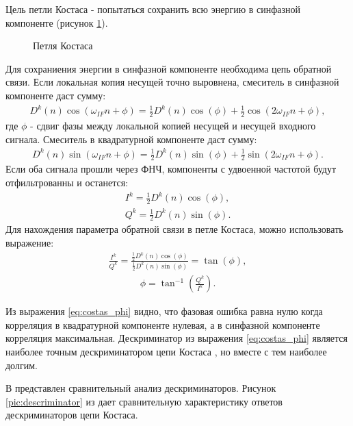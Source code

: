 Цель петли Костаса - попытаться сохранить всю энергию в синфазной компоненте (рисунок \ref{pic:costas}).

\begin{figure}[H]
\begin{center}
\end{center}
\caption{Петля Костаса}
\label{pic:costas}
\end{figure}

Для сохраниения энергии в синфазной компоненте необходима цепь обратной связи. Если локальная копия несущей точно выровнена, смеситель в 
синфазной компоненте даст сумму:
\begin{eqnarray}
D^k(n)\cos(\omega_{IF}n + \phi) = \frac{1}{2}D^k(n)\cos(\phi) + \frac{1}{2}\cos(2\omega_{IF}n + \phi),
\label{eq:costas_i}
\end{eqnarray}
где ${\phi}$ - сдвиг фазы между локальной копией несущей и несущей входного сигнала. Смеситель в квадратурной
компоненте даст сумму:
\begin{eqnarray}
D^k(n)\sin(\omega_{IF}n + \phi) = \frac{1}{2}D^k(n)\sin(\phi) + \frac{1}{2}\sin(2\omega_{IF}n + \phi).
\label{eq:costas_q}
\end{eqnarray}
Если оба сигнала прошли через ФНЧ, компоненты с удвоенной частотой будут отфильтрованны и останется:
\begin{eqnarray}
I^k = \frac{1}{2}D^k(n)\cos(\phi), \\
Q^k = \frac{1}{2}D^k(n)\sin(\phi).
\label{eq:costas_iq}
\end{eqnarray}
Для нахождения параметра обратной связи в петле Костаса, можно использовать выражение:
\begin{eqnarray}
\frac{I^k}{Q^k} = \frac{\frac{1}{2}D^k(n)\cos(\phi)}{\frac{1}{2}D^k(n)\sin(\phi)} = \tan(\phi),
\label{eq:costas_descr}
\end{eqnarray}
\begin{eqnarray}
\phi = \tan^{-1}({\frac{Q^k}{I^k}}).
\label{eq:costas_phi}
\end{eqnarray}

Из выражения \ref{eq:costas_phi} видно, что фазовая ошибка равна нулю когда корреляция в квадратурной
компоненте нулевая, а в синфазной компоненте корреляция максимальная. Дескриминатор из выражения \ref{eq:costas_phi}
является наиболее точным дескриминатором цепи Костаса \cite{gps}, но вместе с тем наиболее долгим.

В \cite{gps} представлен сравнительный анализ дескриминаторов. Рисунок \ref{pic:descriminator} из \cite{gps} дает сравнительную
характеристику ответов дескриминаторов цепи Костаса.

